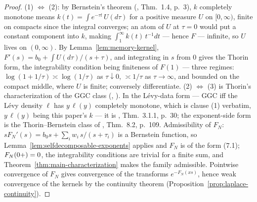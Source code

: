 \begin{proof}
(1) $\Leftrightarrow$ (2): by Bernstein's theorem (,
Thm.~1.4, p.~3), $k$ completely monotone means $k(t) = \int e^{-\tau t}\,U(d\tau)$ for a
positive measure $U$ on $[0,\infty)$, finite on compacts since the integral converges; an
atom of $U$ at $\tau = 0$ would put a constant component into $k$, making
$\int_1^\infty k(t)\,t^{-1}dt$ --- hence $F$ --- infinite, so $U$ lives on $(0,\infty)$. By
Lemma~\ref{lem:memory-kernel},
$F'(s) = b_0 + \int U(d\tau)/(s + \tau)$, and integrating in $s$ from $0$ gives the Thorin
form, the integrability condition being finiteness of $F(1)$ --- three regimes:
$\log(1+1/\tau) \asymp \log(1/\tau)$ as $\tau \downarrow 0$, $\asymp 1/\tau$ as
$\tau \to \infty$, and bounded on the compact middle, where $U$ is finite; conversely
differentiate.
(2) $\Leftrightarrow$ (3) is Thorin's characterization of the GGC class
(, ). In the L\'evy-data form --- GGC
iff the L\'evy density $\ell$ has $y\,\ell(y)$ completely monotone, which is clause (1)
verbatim, $y\,\ell(y)$ being this paper's $k$ --- it is ,
Thm.~3.1.1, p.~30; the exponent-side form is the Thorin--Bernstein class of
, Thm.~8.2, p.~109.
Admissibility of $F_N$: $sF_N'(s) = b_0 s + \sum_i w_i\, s/(s + \tau_i)$ is a Bernstein
function, so Lemma~\ref{lem:selfdecomposable-exponents} applies and $F_N$ is of the form
(7.1); $F_N(0{+}) = 0$, the integrability conditions are trivial for a finite sum, and
Theorem~\ref{thm:main-characterization} makes the family admissible. Pointwise
convergence of $F_N$ gives convergence of the transforms $e^{-F_N(xs)}$, hence weak
convergence of the kernels by the continuity theorem
(Proposition~\ref{prop:laplace-continuity}).
\end{proof}


